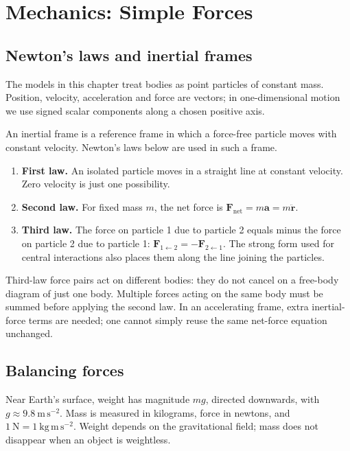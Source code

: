 \chapter{Mechanics: Simple Forces}\label{chap:applied-mechanics}

\section{Newton's laws and inertial frames}
The models in this chapter treat bodies as point particles of constant mass.
Position, velocity, acceleration and force are vectors; in one-dimensional
motion we use signed scalar components along a chosen positive axis.

\begin{definition}
An inertial frame is a reference frame in which a force-free particle moves
with constant velocity. Newton's laws below are used in such a frame.
\end{definition}
\begin{enumerate}
\item \textbf{First law.} An isolated particle moves in a straight line at
constant velocity. Zero velocity is just one possibility.
\item \textbf{Second law.} For fixed mass $m$, the net force is
$\mathbf F_{\mathrm{net}}=m\mathbf a=m\ddot{\mathbf r}$.
\item \textbf{Third law.} The force on particle 1 due to particle 2 equals
minus the force on particle 2 due to particle 1:
$\mathbf F_{1\leftarrow2}=-\mathbf F_{2\leftarrow1}$.
The strong form used for central interactions also places them along the
line joining the particles.
\end{enumerate}
Third-law force pairs act on different bodies: they do not cancel on a
free-body diagram of just one body. Multiple forces acting on the same body
must be summed before applying the second law.
In an accelerating frame, extra inertial-force terms are needed; one cannot
simply reuse the same net-force equation unchanged.

\section{Balancing forces}
Near Earth's surface, weight has magnitude $mg$, directed downwards, with
$g\approx9.8\ \mathrm{m\,s^{-2}}$. Mass is measured in kilograms, force in
newtons, and $1\ \mathrm N=1\ \mathrm{kg\,m\,s^{-2}}$.
Weight depends on the gravitational field; mass does not disappear when
an object is weightless.

